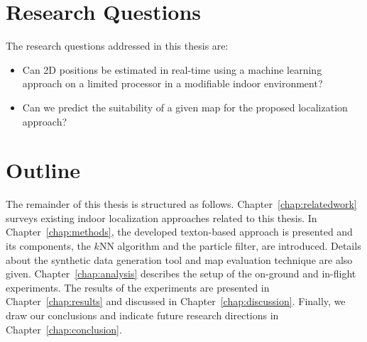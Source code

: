 \section{Research Questions}
\label{sec:researchquestions}

The research questions addressed in this thesis are:

\begin{itemize}
\item Can 2D positions be estimated in real-time using a machine
  learning approach on a limited processor in a modifiable indoor
  environment?
\item Can we predict the suitability of a given map for the proposed
  localization approach?
\end{itemize}

\section{Outline}
\label{sec:outline}

The remainder of this thesis is structured as follows.
Chapter~\ref{chap:relatedwork} surveys existing indoor localization
approaches related to this thesis. In Chapter~\ref{chap:methods}, the
developed texton-based approach is presented and its components, the
$k$NN algorithm and the particle filter, are introduced. Details about
the synthetic data generation tool and map evaluation technique are
also given. Chapter~\ref{chap:analysis} describes the setup of the
on-ground and in-flight experiments. The results of the experiments
are presented in Chapter~\ref{chap:results} and discussed in
Chapter~\ref{chap:discussion}. Finally, we draw our conclusions and
indicate future research directions in Chapter~\ref{chap:conclusion}.
